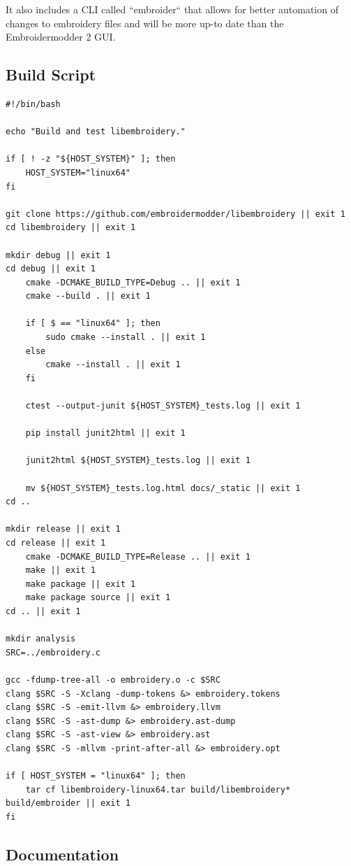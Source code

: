 \documentclass[10pt]{report}
\begin{document}
It also includes a CLI called ``embroider`` that allows for better automation of
changes to embroidery files and will be more up-to date than
the Embroidermodder 2 GUI.

\subsection{Build Script}

\begin{lstlisting}
#!/bin/bash

echo "Build and test libembroidery."

if [ ! -z "${HOST_SYSTEM}" ]; then
    HOST_SYSTEM="linux64"
fi

git clone https://github.com/embroidermodder/libembroidery || exit 1
cd libembroidery || exit 1

mkdir debug || exit 1
cd debug || exit 1
    cmake -DCMAKE_BUILD_TYPE=Debug .. || exit 1
    cmake --build . || exit 1

    if [ $ == "linux64" ]; then
	    sudo cmake --install . || exit 1
    else
        cmake --install . || exit 1
    fi

    ctest --output-junit ${HOST_SYSTEM}_tests.log || exit 1

    pip install junit2html || exit 1

    junit2html ${HOST_SYSTEM}_tests.log || exit 1

    mv ${HOST_SYSTEM}_tests.log.html docs/_static || exit 1
cd ..

mkdir release || exit 1
cd release || exit 1
    cmake -DCMAKE_BUILD_TYPE=Release .. || exit 1
    make || exit 1
    make package || exit 1
    make package source || exit 1
cd .. || exit 1

mkdir analysis
SRC=../embroidery.c

gcc -fdump-tree-all -o embroidery.o -c $SRC
clang $SRC -S -Xclang -dump-tokens &> embroidery.tokens
clang $SRC -S -emit-llvm &> embroidery.llvm
clang $SRC -S -ast-dump &> embroidery.ast-dump
clang $SRC -S -ast-view &> embroidery.ast
clang $SRC -S -mllvm -print-after-all &> embroidery.opt

if [ HOST_SYSTEM = "linux64" ]; then
    tar cf libembroidery-linux64.tar build/libembroidery* build/embroider || exit 1
fi
\end{lstlisting}

\subsection{Documentation}
\end{document}
